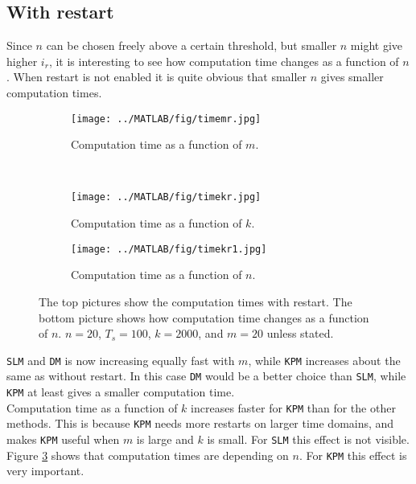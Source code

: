 \subsection{With restart}
Since $n$ can be chosen freely above a certain threshold, but smaller $n$ might give higher $i_r$, it is interesting to see how computation time changes as a function of $n$. When restart is not enabled it is quite obvious that smaller $n$ gives smaller computation times.\\
\begin{figure}[H]
        \centering
        \begin{subfigure}[b]{0.45\textwidth}
                \texttt{[image: ../MATLAB/fig/timemr.jpg]}
                \caption{ Computation time as a function of $m$. }
                \label{fig:timemr}
        \end{subfigure}
        ~
        \begin{subfigure}[b]{0.45\textwidth}
                \texttt{[image: ../MATLAB/fig/timekr.jpg]}
                \caption{ Computation time as a function of $k$. }
                \label{fig:timekr}
        \end{subfigure}
        
        \begin{subfigure}[b]{0.45\textwidth}
                \texttt{[image: ../MATLAB/fig/timekr1.jpg]}
                \caption{ Computation time as a function of $n$. }
                \label{fig:timekr1}
        \end{subfigure}        
        
        \caption{ The top pictures show the computation times with restart. The bottom picture shows how computation time changes as a function of $n$. $n = 20$, $T_s = 100$, $k = 2000$, and $m = 20$ unless stated. }
        \label{fig:time1}
\end{figure}

\noindent \texttt{SLM} and \texttt{DM} is now increasing equally fast with $m$, while \texttt{KPM} increases about the same as without restart. In this case \texttt{DM} would be a better choice than \texttt{SLM}, while \texttt{KPM} at least gives a smaller computation time. \\
Computation time as a function of $k$ increases faster for \texttt{KPM} than for the other methods. This is because \texttt{KPM} needs more restarts on larger time domains, and makes \texttt{KPM} useful when $m$ is large and $k$ is small. For \texttt{SLM} this effect is not visible. \\
Figure \ref{fig:timekr1} shows that computation times are depending on $n$. For \texttt{KPM} this effect is very important. \\

